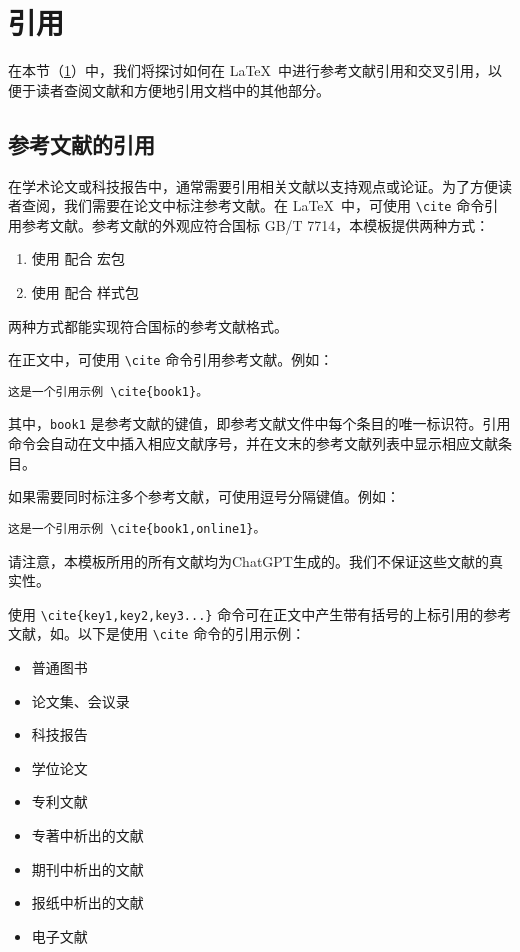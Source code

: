 \section{引用}\label{sec:reference}

在本节（{\cref{sec:reference}}）中，我们将探讨如何在 \LaTeX\ 中进行参考文献引用和交叉引用，以便于读者查阅文献和方便地引用文档中的其他部分。

\subsection{参考文献的引用}

在学术论文或科技报告中，通常需要引用相关文献以支持观点或论证。为了方便读者查阅，我们需要在论文中标注参考文献。在 \LaTeX\ 中，可使用 \verb|\cite| 命令引用参考文献。参考文献的外观应符合国标 GB/T 7714，本模板提供两种方式：
\begin{enumerate}
    \item 使用 \BibTeX{} 配合  宏包
    \item 使用 \BibLaTeX{} 配合  样式包
\end{enumerate}
两种方式都能实现符合国标的参考文献格式。

在正文中，可使用 \verb|\cite| 命令引用参考文献。例如：

\begin{Verbatim}
这是一个引用示例 \cite{book1}。
\end{Verbatim}

其中，\verb|book1| 是参考文献的键值，即参考文献文件中每个条目的唯一标识符。引用命令会自动在文中插入相应文献序号，并在文末的参考文献列表中显示相应文献条目。

如果需要同时标注多个参考文献，可使用逗号分隔键值。例如：

\begin{Verbatim}
这是一个引用示例 \cite{book1,online1}。
\end{Verbatim}

请注意，本模板所用的所有文献均为ChatGPT生成的。我们不保证这些文献的真实性。

使用 \verb|\cite{key1,key2,key3...}| 命令可在正文中产生带有括号的上标引用的参考文献，如\cite{book1,online1,article1}。以下是使用 \verb|\cite| 命令的引用示例：
\begin{itemize}
  \item 普通图书\cite{book1,book2}
  \item 论文集、会议录\cite{conf1,conf2}
  \item 科技报告\cite{techreport1,techreport2}
  \item 学位论文\cite{thesis1,thesis2,thesis3}
  \item 专利文献\cite{patent1,patent2}
  \item 专著中析出的文献\cite{inbook1,inbook2}
  \item 期刊中析出的文献\cite{qin2021,article1,article2}
  \item 报纸中析出的文献\cite{newspaper1,newspaper2}
  \item 电子文献\cite{online1,online2,online3}
\end{itemize}

